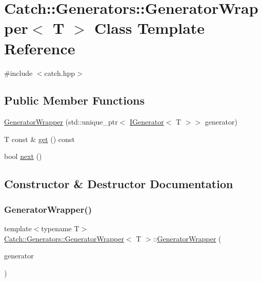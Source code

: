 \hypertarget{class_catch_1_1_generators_1_1_generator_wrapper}{}\section{Catch\+:\+:Generators\+:\+:Generator\+Wrapper$<$ T $>$ Class Template Reference}
\label{class_catch_1_1_generators_1_1_generator_wrapper}


{\ttfamily \#include $<$catch.\+hpp$>$}

\subsection*{Public Member Functions}
\begin{DoxyCompactItemize}
\item 
\mbox{\hyperlink{class_catch_1_1_generators_1_1_generator_wrapper_aecffeafd4fd38d91a52dadf28b6e2b29}{Generator\+Wrapper}} (std\+::unique\+\_\+ptr$<$ \mbox{\hyperlink{struct_catch_1_1_generators_1_1_i_generator}{I\+Generator}}$<$ T $>$$>$ generator)
\item 
T const  \& \mbox{\hyperlink{class_catch_1_1_generators_1_1_generator_wrapper_a271f0f905f2c473c907550435b81e102}{get}} () const
\item 
bool \mbox{\hyperlink{class_catch_1_1_generators_1_1_generator_wrapper_acbfdca94811ae02461bd2cf5f60b666e}{next}} ()
\end{DoxyCompactItemize}


\subsection{Constructor \& Destructor Documentation}
\mbox{\label{class_catch_1_1_generators_1_1_generator_wrapper_aecffeafd4fd38d91a52dadf28b6e2b29}} 
\subsubsection{\texorpdfstring{Generator\+Wrapper()}{GeneratorWrapper()}}
{\footnotesize\ttfamily template$<$typename T$>$ \\
\mbox{\hyperlink{class_catch_1_1_generators_1_1_generator_wrapper}{Catch\+::\+Generators\+::\+Generator\+Wrapper}}$<$ T $>$\+::\mbox{\hyperlink{class_catch_1_1_generators_1_1_generator_wrapper}{Generator\+Wrapper}} (\begin{DoxyParamCaption}\item[{std\+::unique\+\_\+ptr$<$ \mbox{\hyperlink{struct_catch_1_1_generators_1_1_i_generator}{I\+Generator}}$<$ T $>$$>$}]{generator }\end{DoxyParamCaption})\hspace{0.3cm}{\ttfamily [inline]}}



